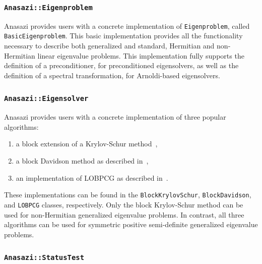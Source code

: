 \documentclass[acmtoms]{acmtrans2m}
\newcounter{algorithm}
\newcommand{\aspace}[1]{\texttt{#1}}
\begin{document}
\subsubsection{\aspace{Anasazi::Eigenproblem}}

Anasazi provides users with a concrete implementation of
\aspace{Eigenproblem}, called \aspace{BasicEigenproblem}. This basic implementation
provides all the functionality necessary to describe both generalized and standard,
Hermitian and non-Hermitian linear eigenvalue problems. This implementation fully 
supports the definition of a preconditioner, for preconditioned eigensolvers, 
as well as the definition of a spectral transformation, for Arnoldi-based eigensolvers. 

\subsubsection{\aspace{Anasazi::Eigensolver}}

Anasazi provides users with a concrete implementation of three popular algorithms:
\begin{enumerate}
  \item a block extension of a Krylov-Schur method~\cite{stew:01},
  \item a block Davidson method as described in~\cite{Arbenz:2005:ACE},
  \item an implementation of LOBPCG as described in~\cite{Hetmaniuk:2006:BSL}.
\end{enumerate}
These implementations can be found in the \aspace{BlockKrylovSchur}, \aspace{BlockDavidson}, 
and \aspace{LOBPCG} classes, respectively. Only the block Krylov-Schur method can be used
for non-Hermitian generalized eigenvalue problems. In contrast, all three algorithms can 
be used for symmetric positive semi-definite generalized eigenvalue problems.

\subsubsection{\aspace{Anasazi::StatusTest}}
\end{document}
